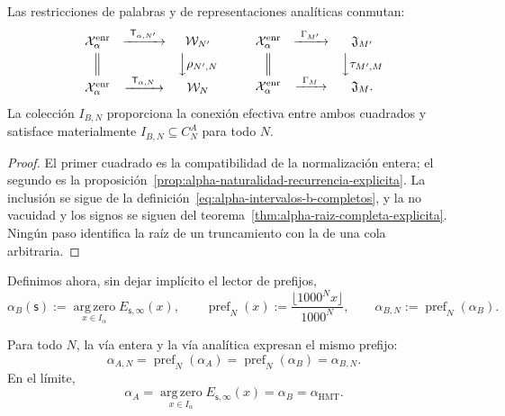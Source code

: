 \begin{proposition}
\label{prop:alpha-cuadrados-compatibilidad}
Las restricciones de palabras y de representaciones analíticas conmutan:
\[
\begin{array}{ccc}
 \mathcal X_\alpha^{\mathrm{enr}}&
 \xrightarrow{\ \mathsf T_{\alpha,N'}\ }&\mathcal W_{N'}\\[1mm]
 \Big\Vert&&\Big\downarrow\rho_{N',N}\\[1mm]
 \mathcal X_\alpha^{\mathrm{enr}}&
 \xrightarrow{\ \mathsf T_{\alpha,N}\ }&\mathcal W_N
\end{array}
\qquad
\begin{array}{ccc}
 \mathcal X_\alpha^{\mathrm{enr}}&
 \xrightarrow{\ \Gamma_{M'}\ }&\mathfrak J_{M'}\\[1mm]
 \Big\Vert&&\Big\downarrow\tau_{M',M}\\[1mm]
 \mathcal X_\alpha^{\mathrm{enr}}&
 \xrightarrow{\ \Gamma_M\ }&\mathfrak J_M .
\end{array}
\]
La colección \(I_{B,N}\) proporciona la conexión efectiva entre ambos
cuadrados y satisface materialmente
\(I_{B,N}\subseteq C_N^A\) para todo \(N\).
\end{proposition}

\begin{proof}
El primer cuadrado es la compatibilidad de la normalización entera; el segundo
es la proposición~\ref{prop:alpha-naturalidad-recurrencia-explicita}. La
inclusión se sigue de la definición~\eqref{eq:alpha-intervalos-b-completos},
y la no vacuidad y los signos se siguen del
teorema~\ref{thm:alpha-raiz-completa-explicita}. Ningún paso identifica la
raíz de un truncamiento con la de una cola arbitraria.
\end{proof}

Definimos ahora, sin dejar implícito el lector de prefijos,
\begin{equation}
 \alpha_B(\mathsf s):=
 \operatorname*{arg\,zero}_{x\in I_\alpha}E_{\mathsf s,\infty}(x),
 \qquad
 \operatorname{pref}_N(x):=
 \frac{\lfloor1000^Nx\rfloor}{1000^N},
 \qquad
 \alpha_{B,N}:=\operatorname{pref}_N(\alpha_B).
 \label{eq:alpha-definicion-b-y-prefijos-rev08}
\end{equation}

\begin{theorem}
\label{thm:alpha-dos-publicaciones-completas}
Para todo \(N\), la vía entera y la vía analítica expresan el mismo prefijo:
\begin{equation}
 \boxed{\alpha_{A,N}=\operatorname{pref}_N(\alpha_A)
 =\operatorname{pref}_N(\alpha_B)=\alpha_{B,N}.}
 \label{eq:alpha-dos-vias-cada-nivel}
\end{equation}
En el límite,
\begin{equation}
 \boxed{\alpha_A
 =\operatorname*{arg\,zero}_{x\in I_\alpha}
       E_{\mathsf s,\infty}(x)
 =\alpha_B=\alpha_{\mathrm{HMT}}.}
 \label{eq:alpha-dos-vias-limite-coinductivo}
\end{equation}
\end{theorem}

